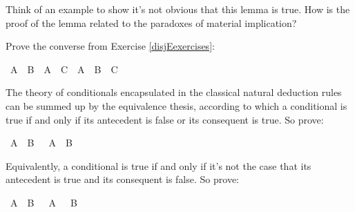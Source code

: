 \begin{isabellebody}
{\isafoldproof}%
%
\isadelimproof
%
\endisadelimproof
%
\begin{isamarkuptext}%
Think of an example to show it's not obvious that this lemma is true. How is the proof of
the lemma related to the paradoxes of material implication?%
\end{isamarkuptext}\isamarkuptrue%
%
\begin{isamarkuptext}%
\begin{Exercise}  Prove the converse from Exercise \ref{disjEexercises}: \end{Exercise}%
\end{isamarkuptext}\isamarkuptrue%
\isamarkupfalse%
\ {\isachardoublequoteopen}{\isacharparenleft}A\ {\isasymor}\ B{\isacharparenright}\ {\isasymand}\ {\isacharparenleft}A\ {\isasymor}\ C{\isacharparenright}\ {\isasymlongrightarrow}\ A\ {\isasymor}\ B\ {\isasymand}\ C{\isachardoublequoteclose}%
\isadelimproof
\ %
\endisadelimproof
%
\isatagproof
{}\isamarkupfalse%
%
\endisatagproof
{\isafoldproof}%
%
\isadelimproof
%
\endisadelimproof
%
\begin{isamarkuptext}%
\begin{Exercise}[title = The Equivalence Thesis]
The theory of conditionals encapsulated in the classical natural deduction rules can be
summed up by the equivalence thesis, according to which a conditional is true if and only if
its antecedent is false or its consequent is true. So prove:  \end{Exercise}%
\end{isamarkuptext}\isamarkuptrue%
\isamarkupfalse%
\ {\isachardoublequoteopen}{\isacharparenleft}A\ {\isasymlongrightarrow}\ B{\isacharparenright}\ {\isasymlongleftrightarrow}\ {\isacharparenleft}{\isasymnot}\ A\ {\isasymor}\ B{\isacharparenright}{\isachardoublequoteclose}%
\isadelimproof
\ %
\endisadelimproof
%
\isatagproof
{}\isamarkupfalse%
%
\endisatagproof
{\isafoldproof}%
%
\isadelimproof
%
\endisadelimproof
%
\begin{isamarkuptext}%
Equivalently, a conditional is true if and only if it's not the case that its antecedent is
true and its consequent is false. So prove:%
\end{isamarkuptext}\isamarkuptrue%
\isamarkupfalse%
\ {\isachardoublequoteopen}{\isacharparenleft}A\ {\isasymlongrightarrow}\ B{\isacharparenright}\ {\isasymlongleftrightarrow}\ {\isasymnot}\ {\isacharparenleft}A\ {\isasymand}\ {\isasymnot}\ B{\isacharparenright}{\isachardoublequoteclose}%
\isadelimproof

\end{isabellebody}
